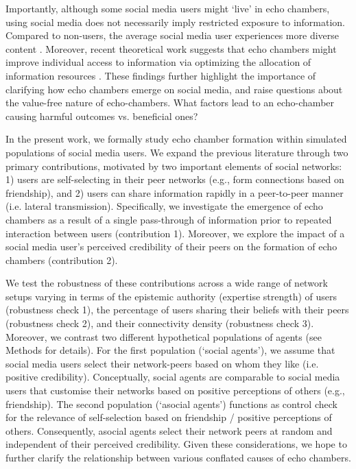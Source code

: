 \documentclass[fleqn,10pt]{wlscirep}
\begin{document}
Importantly, although some social media users might `live' in echo chambers, using social media does not necessarily imply restricted exposure to information. Compared to non-users, the average social media user experiences more diverse content \cite{newman2017reuters}. Moreover, recent theoretical work suggests that echo chambers might improve individual access to information via optimizing the allocation of information resources \cite{jann2018echo}. These findings further highlight the importance of clarifying how echo chambers emerge on social media, and raise questions about the value-free nature of echo-chambers. What factors lead to an echo-chamber causing harmful outcomes vs. beneficial ones? 

In the present work, we formally study echo chamber formation within simulated populations of social media users. We expand the previous literature through two primary contributions, motivated by two important elements of social networks: 1) users are self-selecting in their peer networks (e.g., form connections based on friendship), and 2) users can share information rapidly in a peer-to-peer manner (i.e. lateral transmission). Specifically, we investigate the emergence of echo chambers as a result of a single pass-through of information prior to repeated interaction between users (contribution 1). Moreover, we explore the impact of a social media user's perceived credibility of their peers on the formation of echo chambers (contribution 2). 

We test the robustness of these contributions across a wide range of network setups varying in terms of the epistemic authority (expertise strength) of users (robustness check 1), the percentage of users sharing their beliefs with their peers (robustness check 2), and their connectivity density (robustness check 3). Moreover, we contrast two different hypothetical populations of agents (see Methods for details). For the first population (`social agents'), we assume that social media users select their network-peers based on whom they like (i.e. positive credibility). Conceptually, social agents are comparable to social media users that customise their networks based on positive perceptions of others (e.g., friendship). The second population (`asocial agents') functions as control check for the relevance of self-selection based on friendship / positive perceptions of others. Consequently, asocial agents select their network peers at random and independent of their perceived credibility. Given these considerations, we hope to further clarify the relationship between various conflated causes of echo chambers. 
\end{document}
